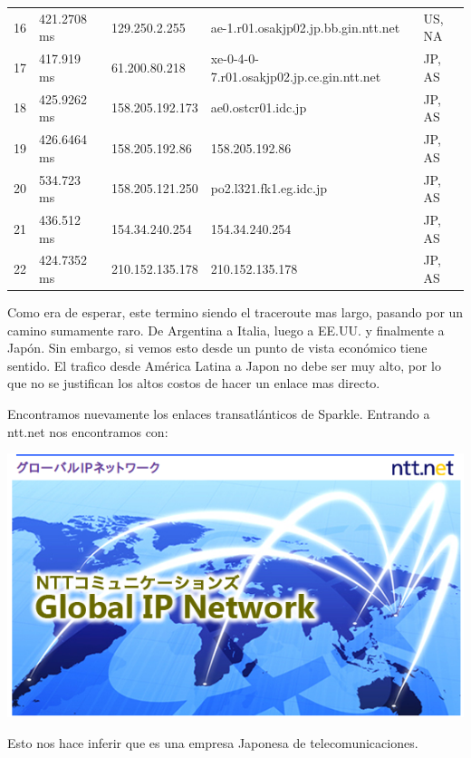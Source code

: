 \begin{table}[H]
\begin{tabular}{@{}lllll@{}}
16 & 421.2708 ms & 129.250.2.255 & ae-1.r01.osakjp02.jp.bb.gin.ntt.net & US, NA\\
17 & 417.919 ms & 61.200.80.218 & xe-0-4-0-7.r01.osakjp02.jp.ce.gin.ntt.net & JP, AS\\
18 & 425.9262 ms & 158.205.192.173 & ae0.ostcr01.idc.jp & JP, AS\\
19 & 426.6464 ms & 158.205.192.86 & 158.205.192.86 & JP, AS\\
20 & 534.723 ms & 158.205.121.250 & po2.l321.fk1.eg.idc.jp & JP, AS\\
21 & 436.512 ms & 154.34.240.254 & 154.34.240.254 & JP, AS\\
22 & 424.7352 ms & 210.152.135.178 & 210.152.135.178 & JP, AS\\
 \bottomrule
\end{tabular}
\label{tokyo}
\end{table}

\vspace{1px}

Como era de esperar, este termino siendo el traceroute mas largo, pasando por un camino sumamente raro. De Argentina a Italia, luego a EE.UU. y finalmente a Japón. Sin embargo, si vemos esto desde un punto de vista económico tiene sentido. El trafico desde América Latina a Japon no debe ser muy alto, por lo que no se justifican los altos costos de hacer un enlace mas directo.

Encontramos nuevamente los enlaces transatlánticos de Sparkle. Entrando a ntt.net nos encontramos con:

\includegraphics[width=\textwidth,keepaspectratio]{images/ntt}

Esto nos hace inferir que es una empresa Japonesa de telecomunicaciones.